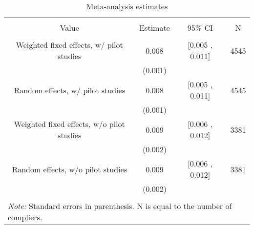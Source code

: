 
\begin{table}[!htbp] \centering 
  \caption{Meta-analysis estimates} 
  \label{meta} 
\begin{tabular}{@{\extracolsep{30pt}} cccc} 
\\[-1.8ex]\hline 
\hline \\[-1.8ex] 
Value & Estimate & 95\% CI & N \\ 
\hline \\[-1.8ex] 
Weighted fixed effects, w/ pilot studies & 0.008 & [0.005 , 0.011] & 4545 \\ 
 & (0.001) &  &  \\ 
Random effects, w/ pilot studies & 0.008 & [0.005 , 0.011] & 4545 \\ 
 & (0.001) &  &  \\ 
Weighted fixed effects, w/o pilot studies & 0.009 & [0.006 , 0.012] & 3381 \\ 
 & (0.002) &  &  \\ 
Random effects, w/o pilot studies & 0.009 & [0.006 , 0.012] & 3381 \\ 
 & (0.002) &  &  \\ 
\hline \\[-1.8ex] 
\multicolumn{4}{l}{\parbox[t]{\textwidth}{\footnotesize \textit{Note:} Standard errors in parenthesis. N is equal to the number of compliers.}} \\ 
\end{tabular} 
\end{table} 
